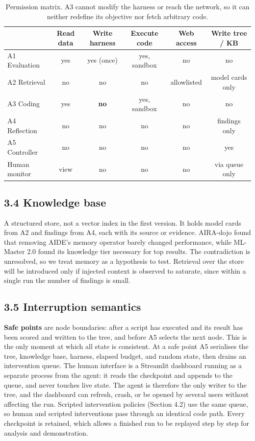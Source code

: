 \documentclass[11pt]{article}
\begin{document}
\begin{table}[H]
\centering
\small
\begin{tabular}{@{}lccccc@{}}
\toprule
& \textbf{Read data} & \textbf{Write harness} & \textbf{Execute code}
& \textbf{Web access} & \textbf{Write tree / KB} \\
\midrule
A1 Evaluation  & yes & yes (once) & yes, sandbox & no  & no \\
A2 Retrieval   & no  & no         & no           & allowlisted & model cards only \\
A3 Coding      & yes & \textbf{no}& yes, sandbox & no  & no \\
A4 Reflection  & no  & no         & no           & no  & findings only \\
A5 Controller  & no  & no         & no           & no  & yes \\
Human monitor  & view & no        & no           & no  & via queue only \\
\bottomrule
\end{tabular}
\caption{Permission matrix. A3 cannot modify the harness or reach the network, so it
can neither redefine its objective nor fetch arbitrary code.}
\label{tab:perms}
\end{table}

\subsection*{3.4 Knowledge base}

A structured store, not a vector index in the first version. It holds model cards
from A2 and findings from A4, each with its source or evidence. AIRA-dojo
\cite{aira} found that removing AIDE's memory operator barely changed performance,
while ML-Master 2.0 \cite{mlmaster2} found its knowledge tier necessary for top
results. The contradiction is unresolved, so we treat memory as a hypothesis to test.
Retrieval over the store will be introduced only if injected context is observed to
saturate, since within a single run the number of findings is small.

\subsection*{3.5 Interruption semantics}

\textbf{Safe points} are node boundaries: after a script has executed and its result
has been scored and written to the tree, and before A5 selects the next node. This is
the only moment at which all state is consistent. At a safe point A5 serialises the
tree, knowledge base, harness, elapsed budget, and random state, then drains an
intervention queue. The human interface is a Streamlit dashboard running as a
separate process from the agent: it reads the checkpoint and appends to the queue,
and never touches live state. The agent is therefore the only writer to the tree,
and the dashboard can refresh, crash, or be opened by several users without
affecting the run. Scripted intervention policies (Section 4.2) use the same queue,
so human and scripted interventions pass through an identical code path. Every
checkpoint is retained, which allows a finished run to be replayed step by step for
analysis and demonstration.
\end{document}
